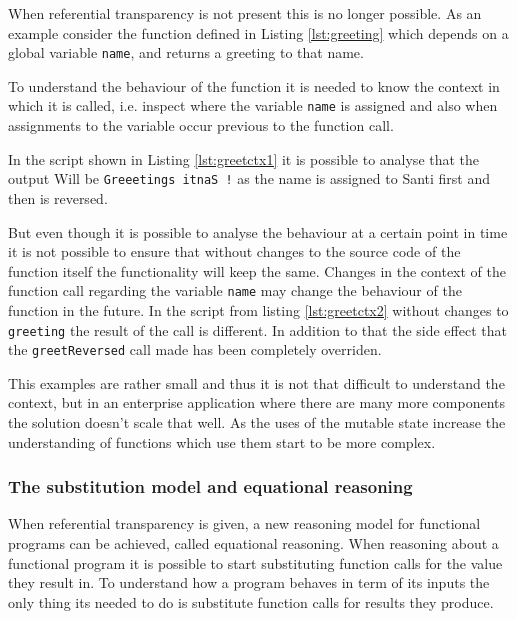 \documentclass[../main.tex]{subfiles}
\begin{document}
When referential transparency is not present this is no longer possible. As an
example consider the function defined in Listing \ref{lst:greeting} which
depends on a global variable \texttt{name}, and returns a greeting to that name.



To understand the behaviour of the function it is needed to know the context in
which it is called, i.e. inspect where the variable \texttt{name} is assigned
and also when assignments to the variable occur previous to the function call.

In the script shown in Listing \ref{lst:greetctx1} it is possible to analyse
that the output Will be \texttt{Greeetings itnaS !} as the name is assigned
to Santi first and then is reversed.



But even though it is possible to analyse the behaviour at a certain point in
time it is not possible to ensure that without changes to the source code of the
function itself the functionality will keep the same. Changes in the context
of the function call regarding the variable \texttt{name} may change the behaviour of
the function in the future. In the script from listing \ref{lst:greetctx2}
without changes to \texttt{greeting} the result of the call is different. In
addition to that the side effect that the \texttt{greetReversed} call made has
been completely overriden.



This examples are rather small and thus it is not that difficult to understand
the context, but in an enterprise application where there are many more
components the solution doesn't scale that well. As the uses of the mutable
state increase the understanding of functions which use them start to be more
complex.

\subsubsection{The substitution model and equational reasoning}

When referential transparency is given, a new reasoning model for functional
programs can be achieved, called equational reasoning. When reasoning about a
functional program it is possible to start substituting function calls for the
value they result in. To understand how a program behaves in term of its inputs
the only thing its needed to do is substitute function calls for results they
produce.
\end{document}
